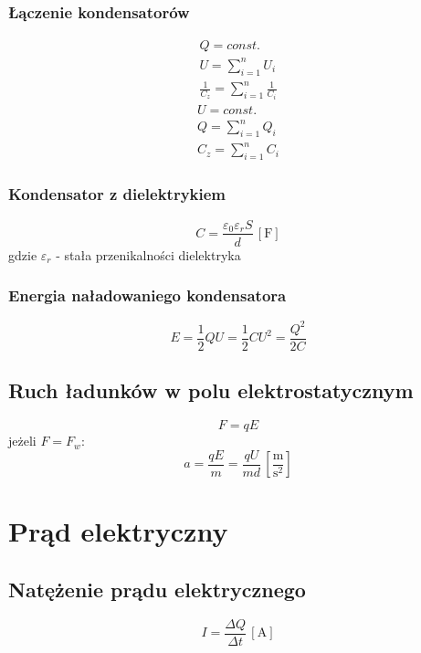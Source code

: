 \documentclass{article}
\numberwithin{equation}{section}
\newcommand{\unit}[1]{\, \left[\mathrm{#1}\right]}
\begin{document}
      \subsubsection{Łączenie kondensatorów}
        \begin{gather}
          Q = const.\\
          U = \sum_{i=1}^n U_i\\
          \frac{1}{C_z} = \sum_{i=1}^n \frac{1}{C_i}
        \end{gather}
        \begin{gather}
          U = const.\\
          Q = \sum_{i=1}^n Q_i\\
          C_z = \sum_{i=1}^n C_i
        \end{gather}
      \subsubsection{Kondensator z dielektrykiem}
      \begin{equation}
        C= \frac{\varepsilon_0\varepsilon_rS}{d} \unit{F}
      \end{equation}
      gdzie $\varepsilon_r$ - stała przenikalności dielektryka
      \subsubsection{Energia naładowaniego kondensatora}
        \begin{equation}
          E = \frac{1}{2}QU = \frac{1}{2}CU^2 = \frac{Q^2}{2C}
        \end{equation}
    \subsection{Ruch ładunków w polu elektrostatycznym}
      \begin{equation}
        F = qE
      \end{equation}
      jeżeli $F = F_w$:
      \begin{equation}
        a = \frac{qE}{m} = \frac{qU}{md} \unit{\frac{m}{s^2}}
      \end{equation}

  \newpage
  \section{Prąd elektryczny}
    \subsection{Natężenie prądu elektrycznego}
      \begin{equation}
        I = \frac{\Delta Q}{\Delta t} \unit{A}
      \end{equation}
\end{document}
